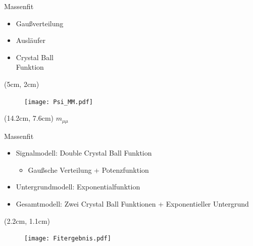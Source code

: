 \begin{frame}[t]{Massenfit}
  \vspace{1cm}
  \begin{itemize} \setlength\itemsep{0.5cm}
    \item<1-> Gaußverteilung
    \item<2-> Ausläufer
    \item<3> \leadsto Crystal Ball\\ Funktion
  \end{itemize}
  \begin{textblock*}{11cm}(5cm, 2cm)
    \begin{figure}
      \texttt{[image: Psi\_MM.pdf]}
    \end{figure}
  \end{textblock*}
  \begin{textblock*}{1cm}(14.2cm, 7.6cm)
    \small{$m_{\mu\mu}$}
  \end{textblock*}
\end{frame}

\begin{frame}[t]{Massenfit}
  \begin{itemize} \setlength\itemsep{0.25cm}
    \item Signalmodell: Double Crystal Ball Funktion
    \begin{itemize}
      \item Gaußsche Verteilung + Potenzfunktion
    \end{itemize}
    \item Untergrundmodell: Exponentialfunktion
    \item Gesamtmodell: Zwei Crystal Ball Funktionen + Exponentieller Untergrund
  \end{itemize}
\end{frame}

\begin{frame}[t]
  \begin{textblock*}{10cm}(2.2cm, 1.1cm)
    \begin{figure}
      \centering
      \texttt{[image: Fitergebnis.pdf]}
    \end{figure}
  \end{textblock*}
\end{frame}

